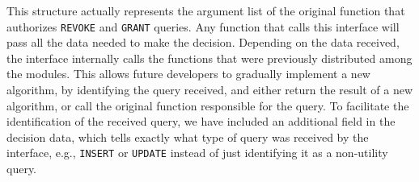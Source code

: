 %
This structure actually represents the argument list of the original function that authorizes \texttt{REVOKE} and \texttt{GRANT} queries.
%
Any function that calls this interface will pass all the data needed to make the decision.
%
Depending on the data received, the interface internally calls the functions that were previously distributed among the modules.
%
This allows future developers to gradually implement a new algorithm, by identifying the query received, and either return the result of a new algorithm, or call the original function responsible for the query.
%
To facilitate the identification of the received query,  we have included an additional field in the decision data, which tells exactly what type of query was received by the interface, e.g., \texttt{INSERT} or \texttt{UPDATE} instead of just identifying it as a non-utility query.


